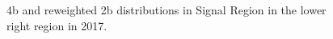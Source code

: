 \begin{figure}[ht]
 
 
    \caption{4b and reweighted 2b distributions in Signal Region in the lower right region in 2017.}
    \label{fig:lower-right-4b-SR-2017}
\end{figure}


